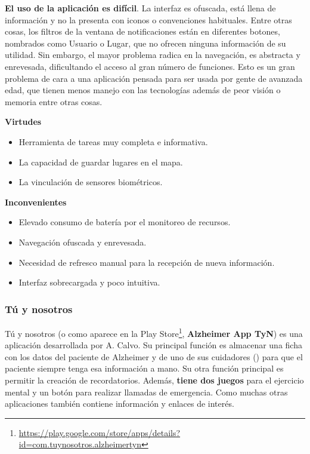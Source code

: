 \textbf{El uso de la aplicación es difícil}. La interfaz es ofuscada, está llena de información y no la presenta con iconos o convenciones habituales. Entre otras cosas, los filtros de la ventana de notificaciones están en diferentes botones, nombrados como Usuario o Lugar, que no ofrecen ninguna información de su utilidad. Sin embargo, el mayor problema radica en la navegación, es abstracta y enrevesada, dificultando el acceso al gran número de funciones. Esto es un gran problema de cara a una aplicación pensada para ser usada por gente de avanzada edad, que tienen menos manejo con las tecnologías además de peor visión o memoria entre otras cosas.

\textbf{Virtudes}
\begin{itemize}
    \item Herramienta de tareas muy completa e informativa.
    \item La capacidad de guardar lugares en el mapa.
    \item La vinculación de sensores biométricos.
\end{itemize}

\textbf{Inconvenientes}
\begin{itemize}
    \item Elevado consumo de batería por el monitoreo de recursos.
    \item Navegación ofuscada y enrevesada.
    \item Necesidad de refresco manual para la recepción de nueva información.
    \item Interfaz sobrecargada y poco intuitiva.
\end{itemize}

\subsubsection{Tú y nosotros}

Tú y nosotros (o como aparece en la Play Store\footnote{\href{https://play.google.com/store/apps/details?id=com.tuynosotros.alzheimertyn}{https://play.google.com/store/apps/details?id=com.tuynosotros.alzheimertyn}}, \textbf{Alzheimer App TyN}) es una aplicación desarrollada por A. Calvo. Su principal función es almacenar una ficha con los datos del paciente de Alzheimer y de uno de sus cuidadores () para que el paciente siempre tenga esa información a mano. Su otra función principal es permitir la creación de recordatorios. Además, \textbf{tiene dos juegos} para el ejercicio mental y un botón para realizar llamadas de emergencia. Como muchas otras aplicaciones también contiene información y enlaces de interés.


